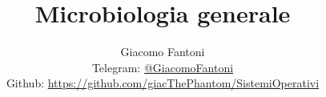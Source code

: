 

\title{\Huge \textbf{Microbiologia generale}}

\author{
  Giacomo Fantoni \\
  \small Telegram: \href{https://t.me/GiacomoFantoni}{@GiacomoFantoni} \\[3pt]
  \small Github: \href{https://github.com/giacThePhantom/SistemiOperativi}{https://github.com/giacThePhantom/SistemiOperativi}}

\maketitle
\tableofcontents




